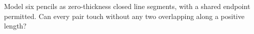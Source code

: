 Model six pencils as zero-thickness closed line segments, with a shared endpoint permitted. Can every pair touch without any two overlapping along a positive length?
